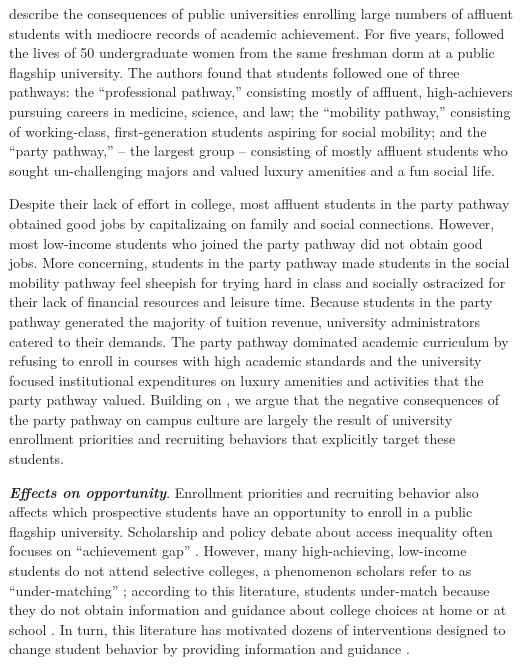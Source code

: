 \documentclass[twoside]{article}
\begin{document}
\cite{RN4231} describe the consequences of public universities enrolling large numbers of affluent students with mediocre records of academic achievement.  For five years, \cite{RN4231} followed the lives of 50 undergraduate women from the same freshman dorm at a public flagship university. The authors found that students followed one of three pathways: the ``professional pathway,'' consisting mostly of affluent, high-achievers pursuing careers in medicine, science, and law; the ``mobility pathway,'' consisting of working-class, first-generation students aspiring for social mobility; and the ``party pathway,'' -- the largest group -- consisting of mostly affluent students who sought un-challenging majors and valued luxury amenities and a fun social life. 

Despite their lack of effort in college, most affluent students in the party pathway obtained good jobs by capitalizaing on family and social connections. However, most low-income students who joined the party pathway did not obtain good jobs. More concerning, students in the party pathway made students in the social mobility pathway feel sheepish for trying hard in class and socially ostracized for their lack of financial resources and leisure time.  Because students in the party pathway generated the majority of tuition revenue, university administrators catered to their demands. The party pathway dominated academic curriculum by refusing to enroll in courses with high academic standards and the university focused institutional expenditures on luxury amenities and activities that the party pathway valued.  Building on \cite{RN4231}, we argue that the negative consequences of the party pathway on campus culture are largely the result of university enrollment priorities and recruiting behaviors that explicitly target these students.

\textbf{\textit{Effects on opportunity}}.  Enrollment priorities and recruiting behavior also affects which prospective students have an opportunity to enroll in a public flagship university.  Scholarship and policy debate about access inequality often focuses on ``achievement gap'' \citep{RN4016}.  However, many high-achieving, low-income students do not attend selective colleges, a phenomenon scholars refer to as ``under-matching'' \citep{RN3699,RN3700}; according to this literature, students under-match because they do not obtain information and guidance about college choices at home or at school \citep{RN4016}. In turn, this literature has motivated dozens of interventions designed to change student behavior by providing information and guidance \citep[e.g., ][]{RN4352,RN4345,RN4351}.
\end{document}
